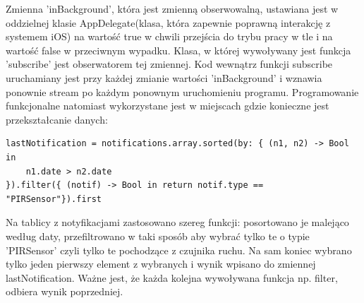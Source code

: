 Zmienna 'inBackground', która jest zmienną obserwowalną, ustawiana jest w oddzielnej klasie AppDelegate(klasa, która zapewnie poprawną interakcję z systemem iOS) na wartość true w chwili przejścia do trybu pracy w tle i na wartość false w przeciwnym wypadku. Klasa, w której wywoływany jest funkcja 'subscribe' jest obserwatorem tej zmiennej. Kod wewnątrz funkcji subscribe uruchamiany jest przy każdej zmianie wartości 'inBackground' i wznawia ponownie stream po każdym ponownym uruchomieniu programu.
Programowanie funkcjonalne natomiast wykorzystane jest w miejscach gdzie konieczne jest przekształcanie danych:
\begin{verbatim}
lastNotification = notifications.array.sorted(by: { (n1, n2) -> Bool in
	n1.date > n2.date 
}).filter({ (notif) -> Bool in return notif.type == "PIRSensor"}).first
\end{verbatim}
Na tablicy z notyfikacjami zastosowano szereg funkcji: posortowano je malejąco według daty, przefiltrowano w taki sposób aby wybrać tylko te o typie 'PIRSensor' czyli tylko te pochodzące z czujnika ruchu. Na sam koniec wybrano tylko jeden pierwszy element z wybranych i wynik wpisano do zmiennej lastNotification. Ważne jest, że każda kolejna wywoływana funkcja np. filter, odbiera wynik poprzedniej.

